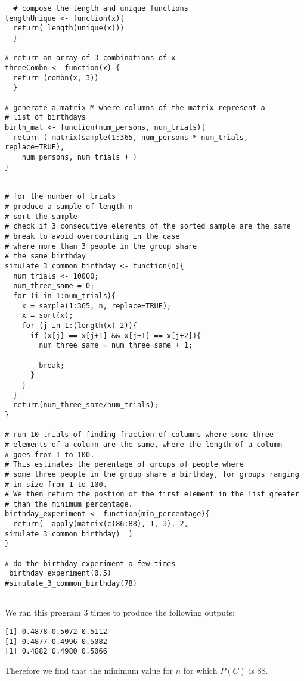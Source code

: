 \documentclass[a4paper,11pt]{article}
\begin{document}
\begin{lstlisting}
  # compose the length and unique functions
lengthUnique <- function(x){
  return( length(unique(x)))
  }

# return an array of 3-combinations of x
threeCombn <- function(x) { 
  return (combn(x, 3))
  }

# generate a matrix M where columns of the matrix represent a
# list of birthdays
birth_mat <- function(num_persons, num_trials){
  return ( matrix(sample(1:365, num_persons * num_trials, replace=TRUE), 
    num_persons, num_trials ) )
}


# for the number of trials
# produce a sample of length n
# sort the sample
# check if 3 consecutive elements of the sorted sample are the same
# break to avoid overcounting in the case
# where more than 3 people in the group share
# the same birthday
simulate_3_common_birthday <- function(n){
  num_trials <- 10000;
  num_three_same = 0;
  for (i in 1:num_trials){
    x = sample(1:365, n, replace=TRUE);
    x = sort(x);
    for (j in 1:(length(x)-2)){
      if (x[j] == x[j+1] && x[j+1] == x[j+2]){
        num_three_same = num_three_same + 1;
        
        break;
      }
    }
  }
  return(num_three_same/num_trials);
}

# run 10 trials of finding fraction of columns where some three
# elements of a column are the same, where the length of a column
# goes from 1 to 100.
# This estimates the perentage of groups of people where 
# some three people in the group share a birthday, for groups ranging
# in size from 1 to 100.
# We then return the postion of the first element in the list greater 
# than the minimum percentage.
birthday_experiment <- function(min_percentage){
  return(  apply(matrix(c(86:88), 1, 3), 2, simulate_3_common_birthday)  )
}

# do the birthday experiment a few times
 birthday_experiment(0.5)
#simulate_3_common_birthday(78)


\end{lstlisting}

We ran this program 3 times to produce the following outputs:

\begin{lstlisting}
[1] 0.4878 0.5072 0.5112
[1] 0.4877 0.4996 0.5082
[1] 0.4882 0.4980 0.5066
\end{lstlisting}

Therefore we find that the minimum value for $n$ for which
$P\left( C \right)$ is $88$.
\printbibliography
\end{document}
